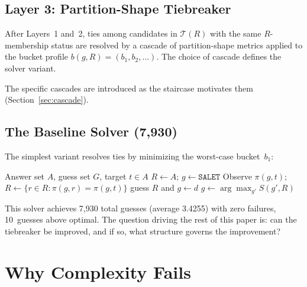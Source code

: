 \documentclass[11pt]{article}
\begin{document}
	\subsection{Layer 3: Partition-Shape Tiebreaker}
	
	After Layers~1 and~2, ties among candidates in $\mathcal{T}(R)$ with the same $R$-membership status are resolved by a cascade of partition-shape metrics applied to the bucket profile $b(g,R) = (b_1, b_2, \ldots)$.  The choice of cascade defines the solver variant.
	
	The specific cascades are introduced as the staircase motivates them (Section~\ref{sec:cascade}).
	
	\subsection{The Baseline Solver (7,930)}
	
	The simplest variant resolves ties by minimizing the worst-case bucket~$b_1$:
	
	\begin{algorithm}[h]
		\caption{Baseline Solver (7,930)}
		\label{alg:baseline}
		\begin{algorithmic}[1]
			\Require Answer set $A$, guess set $G$, target $t \in A$
			\State $R \gets A$;\; $g \gets \texttt{SALET}$
			\Loop
			\State Observe $\pi(g,t)$;\; $R \gets \{r \in R : \pi(g,r) = \pi(g,t)\}$
			 guess $R$ and \Return \EndIf
			\State $g \gets d$ 
			\Else
			\State $g \gets \arg\max_{g'} S(g', R)$ 
			\EndIf
			\EndLoop
		\end{algorithmic}
	\end{algorithm}
	
	This solver achieves 7,930 total guesses (average 3.4255) with zero failures, 10~guesses above optimal.  The question driving the rest of this paper is: can the tiebreaker be improved, and if so, what structure governs the improvement?
	
	\section{Why Complexity Fails}
	\label{sec:complexity}
	
\end{document}
